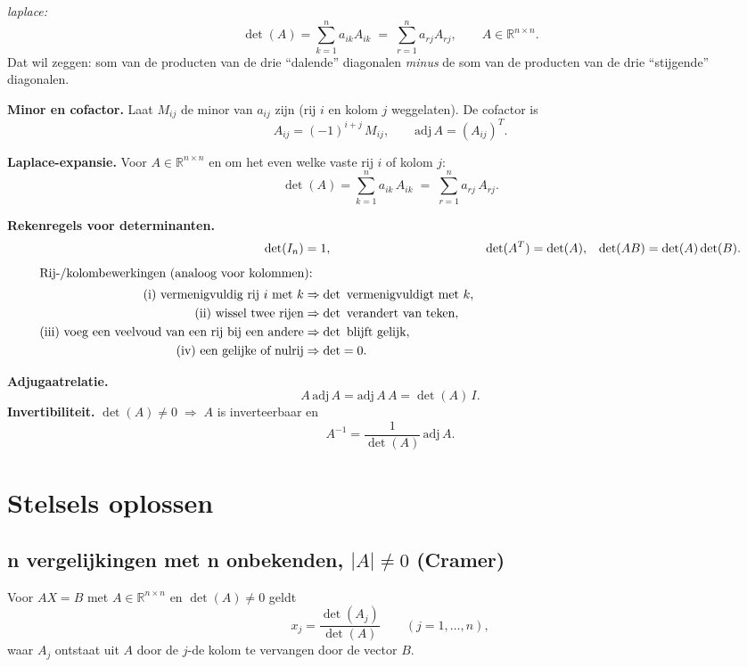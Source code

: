 \documentclass[a5paper]{article}
\begin{document}
{\large \itshape laplace:}\;
\[
\det(A)=\sum_{k=1}^{n} a_{ik}A_{ik}
\;=\;
\sum_{r=1}^{n} a_{rj}A_{rj},
\qquad
A\in\mathbb{R}^{n\times n}.
\]
% 
Dat wil zeggen: som van de producten van de drie ``dalende'' diagonalen \emph{minus} de som van de producten van de drie ``stijgende'' diagonalen.

\medskip
\textbf{Minor en cofactor.} Laat $M_{ij}$ de minor van $a_{ij}$ zijn (rij $i$ en kolom $j$ weggelaten).
De cofactor is
\[
A_{ij} = (-1)^{i+j} \, M_{ij},
\qquad
\mathrm{adj}\,A = (A_{ij})^{T}.
\]

\textbf{Laplace-expansie.} Voor $A\in\mathbb{R}^{n\times n}$ en om het even welke vaste rij $i$ of kolom $j$:
\[
\det(A)=\sum_{k=1}^{n} a_{ik}\,A_{ik}
\;=\;
\sum_{r=1}^{n} a_{rj}\,A_{rj}.
\]

\textbf{Rekenregels voor determinanten.}
\begin{align*}
\det(I_n)&=1, & \det(A^T)&=\det(A), & \det(AB)&=\det(A)\det(B). \\[1mm]
\intertext{Rij-/kolombewerkingen (analoog voor kolommen):}
\text{(i) vermenigvuldig rij $i$ met $k$} &\Rightarrow \det \text{ vermenigvuldigt met } k, \\
\text{(ii) wissel twee rijen} &\Rightarrow \det \text{ verandert van teken}, \\
\text{(iii) voeg een veelvoud van een rij bij een andere} &\Rightarrow \det \text{ blijft gelijk}, \\
\text{(iv) een gelijke of nulrij} &\Rightarrow \det = 0.
\end{align*}

\textbf{Adjugaatrelatie.}
\[
A\,\mathrm{adj}\,A = \mathrm{adj}\,A\,A = \det(A)\,I.
\]
\textbf{Invertibiliteit.} $\det(A)\neq 0 \;\Rightarrow\; A$ is inverteerbaar en
\[
A^{-1} = \frac{1}{\det(A)}\,\mathrm{adj}\,A.
\]


\newpage

\section{Stelsels oplossen}

\subsection{n vergelijkingen met n onbekenden, $|A|\neq 0$ (Cramer)}
Voor $AX=B$ met $A\in\mathbb{R}^{n\times n}$ en $\det(A)\neq0$ geldt
\[
x_j = \frac{\det(A_j)}{\det(A)} \qquad (j=1,\dots,n),
\]
waar $A_j$ ontstaat uit $A$ door de $j$-de kolom te vervangen door de vector $B$.
\end{document}
